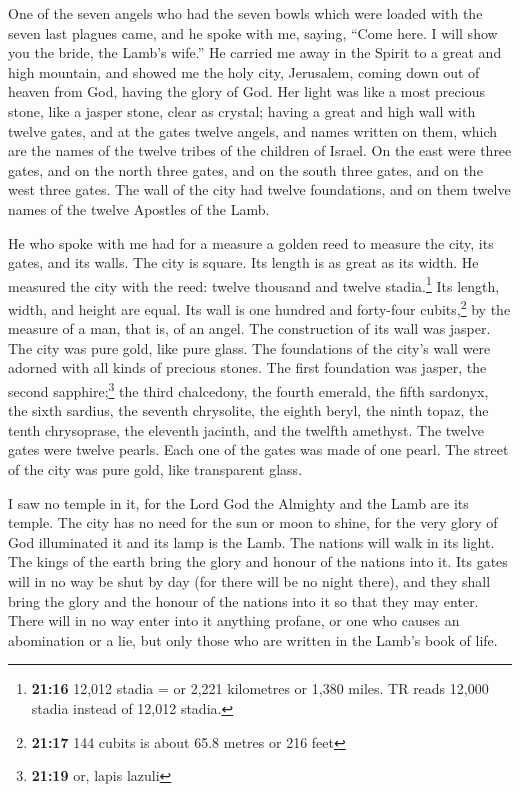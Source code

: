  One of the seven angels who had the seven bowls which
were loaded with the seven last plagues came, and he spoke with me,
saying, ``Come here. I will show you the bride, the Lamb's wife.''
 He carried me away in the Spirit to a great and high
mountain, and showed me the holy city, Jerusalem, coming down out of
heaven from God,  having the glory of God. Her light was
like a most precious stone, like a jasper stone, clear as crystal;
 having a great and high wall with twelve gates, and at
the gates twelve angels, and names written on them, which are the names
of the twelve tribes of the children of Israel.  On the
east were three gates, and on the north three gates, and on the south
three gates, and on the west three gates.  The wall of
the city had twelve foundations, and on them twelve names of the twelve
Apostles of the Lamb.

 He who spoke with me had for a measure a golden reed to
measure the city, its gates, and its walls.  The city is
square. Its length is as great as its width. He measured the city with
the reed: twelve thousand and twelve stadia.\footnote{\textbf{21:16}
  12,012 stadia = or 2,221 kilometres or 1,380 miles. TR reads 12,000
  stadia instead of 12,012 stadia.} Its length, width, and height are
equal.  Its wall is one hundred and forty-four
cubits,\footnote{\textbf{21:17} 144 cubits is about 65.8 metres or 216
  feet} by the measure of a man, that is, of an angel. 
The construction of its wall was jasper. The city was pure gold, like
pure glass.  The foundations of the city's wall were
adorned with all kinds of precious stones. The first foundation was
jasper, the second sapphire;\footnote{\textbf{21:19} or, lapis lazuli}
the third chalcedony, the fourth emerald,  the fifth
sardonyx, the sixth sardius, the seventh chrysolite, the eighth beryl,
the ninth topaz, the tenth chrysoprase, the eleventh jacinth, and the
twelfth amethyst.  The twelve gates were twelve pearls.
Each one of the gates was made of one pearl. The street of the city was
pure gold, like transparent glass.

 I saw no temple in it, for the Lord God the Almighty and
the Lamb are its temple.  The city has no need for the
sun or moon to shine, for the very glory of God illuminated it and its
lamp is the Lamb.  The nations will walk in its light.
The kings of the earth bring the glory and honour of the nations into
it.  Its gates will in no way be shut by day (for there
will be no night there),  and they shall bring the glory
and the honour of the nations into it so that they may enter.
 There will in no way enter into it anything profane, or
one who causes an abomination or a lie, but only those who are written
in the Lamb's book of life.

